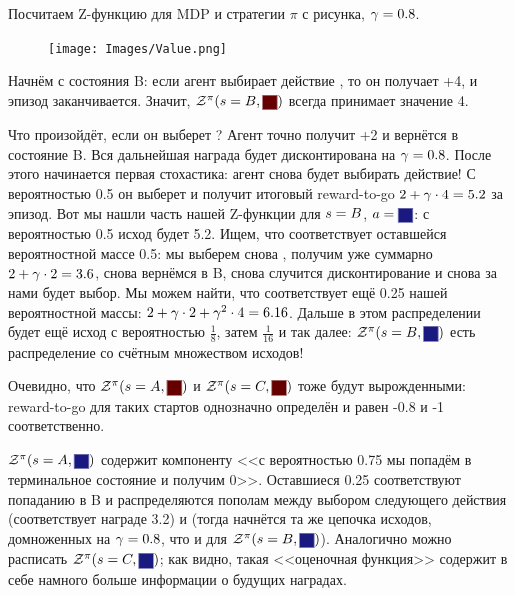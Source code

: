 \begin{exampleBox}[label=ex:zfunction]{}
Посчитаем Z-функцию для MDP и стратегии $\pi$ с рисунка, $\gamma \HM= 0.8$.

\begin{figure}
\vspace{-0.4cm}
\centering
\texttt{[image: Images/Value.png]}
\vspace{-0.4cm}
\end{figure}

Начнём с состояния B: если агент выбирает действие , то он получает +4, и эпизод заканчивается. Значит, $\Z^{\pi}(s \HM= B, \colorsquare{ChadRed})$ всегда принимает значение 4.

Что произойдёт, если он выберет ? Агент точно получит +2 и вернётся в состояние B. Вся дальнейшая награда будет дисконтирована на $\gamma \HM= 0.8$. После этого начинается первая стохастика: агент снова будет выбирать действие! С вероятностью 0.5 он выберет  и получит итоговый reward-to-go $2 \HM+ \gamma \cdot 4 \HM= 5.2$ за эпизод. Вот мы нашли часть нашей Z-функции для $s \HM= B$, $a \HM= \colorsquare{ChadBlue}$: с вероятностью 0.5 исход будет 5.2. Ищем, что соответствует оставшейся вероятностной массе 0.5: мы выберем снова , получим уже суммарно $2 \HM+ \gamma \cdot 2 \HM= 3.6$, снова вернёмся в B, снова случится дисконтирование и снова за нами будет выбор. Мы можем найти, что соответствует ещё 0.25 нашей вероятностной массы: $2 \HM+ \gamma \cdot 2 + \gamma^2 \cdot 4 \HM= 6.16$. Дальше в этом распределении будет ещё исход с вероятностью $\frac{1}{8}$, затем $\frac{1}{16}$ и так далее: $\Z^{\pi}(s \HM= B, \colorsquare{ChadBlue})$ есть распределение со счётным множеством исходов!

Очевидно, что $\Z^{\pi}(s \HM= A, \text{\colorsquare{ChadRed}})$ и $\Z^{\pi}(s \HM= C, \text{\colorsquare{ChadRed}})$ тоже будут вырожденными: reward-to-go для таких стартов однозначно определён и равен -0.8 и -1 соответственно. 

$\Z^{\pi}(s \HM= A, \text{\colorsquare{ChadBlue}})$ содержит компоненту <<с вероятностью 0.75 мы попадём в терминальное состояние и получим 0>>. Оставшиеся 0.25 соответствуют попаданию в B и распределяются пополам между выбором следующего действия  (соответствует награде 3.2) и  (тогда начнётся та же цепочка исходов, домноженных на $\gamma \HM= 0.8$, что и для $\Z^{\pi}(s \HM= B, \colorsquare{ChadBlue})$). Аналогично можно расписать $\Z^{\pi}(s \HM= C, \text{\colorsquare{ChadBlue}})$; как видно, такая <<оценочная функция>> содержит в себе намного больше информации о будущих наградах.
\end{exampleBox}

